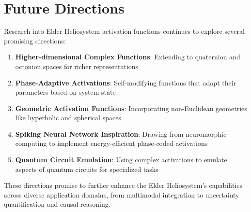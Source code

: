 \section{Future Directions}

Research into Elder Heliosystem activation functions continues to explore several promising directions:

\begin{enumerate}
    \item \textbf{Higher-dimensional Complex Functions}: Extending to quaternion and octonion spaces for richer representations
    \item \textbf{Phase-Adaptive Activations}: Self-modifying functions that adapt their parameters based on system state
    \item \textbf{Geometric Activation Functions}: Incorporating non-Euclidean geometries like hyperbolic and spherical spaces
    \item \textbf{Spiking Neural Network Inspiration}: Drawing from neuromorphic computing to implement energy-efficient phase-coded activations
    \item \textbf{Quantum Circuit Emulation}: Using complex activations to emulate aspects of quantum circuits for specialized tasks
\end{enumerate}

These directions promise to further enhance the Elder Heliosystem's capabilities across diverse application domains, from multimodal integration to uncertainty quantification and causal reasoning.